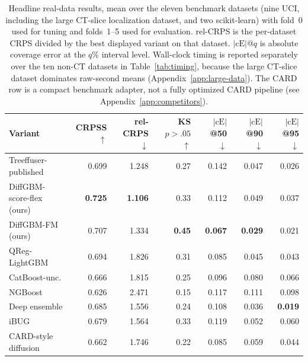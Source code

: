 \documentclass{article}
\begin{document}
\begin{table}[!t]
  \centering
  \caption{Headline real-data results, mean over the eleven benchmark datasets (nine UCI, including the large CT-slice localization dataset, and two scikit-learn) with fold~0 used for tuning and folds~1--5 used for evaluation. rel-CRPS is the per-dataset CRPS divided by the best displayed variant on that dataset. $|\text{cE}|$@$q$ is absolute coverage error at the $q$\% interval level. Wall-clock timing is reported separately over the ten non-CT datasets in Table~\ref{tab:timing}, because the large CT-slice dataset dominates raw-second means (Appendix~\ref{app:large-data}). The CARD row is a compact benchmark adapter, not a fully optimized CARD pipeline (see Appendix~\ref{app:competitors}).}\label{tab:headline}
  \scriptsize
  \begin{tabular}{lrrrrrr}
    \toprule
    Variant & CRPSS $\uparrow$ & rel-CRPS $\downarrow$ & KS $p{>}.05$ $\uparrow$ & $|\text{cE}|$@50 $\downarrow$ & $|\text{cE}|$@90 $\downarrow$ & $|\text{cE}|$@95 $\downarrow$ \\
    \midrule
    Treeffuser-published & 0.699 & 1.248 & 0.27 & 0.142 & 0.047 & 0.026 \\
    DiffGBM-score-flex (ours) & \textbf{0.725} & \textbf{1.106} & 0.33 & 0.112 & 0.049 & 0.037 \\
    DiffGBM-FM (ours) & 0.707 & 1.334 & \textbf{0.45} & \textbf{0.067} & \textbf{0.029} & 0.021 \\
    \midrule
    QReg-LightGBM & 0.694 & 1.826 & 0.31 & 0.085 & 0.045 & 0.043 \\
    CatBoost-unc. & 0.666 & 1.815 & 0.25 & 0.096 & 0.080 & 0.066 \\
    NGBoost & 0.626 & 2.471 & 0.15 & 0.117 & 0.111 & 0.098 \\
    Deep ensemble & 0.685 & 1.556 & 0.24 & 0.108 & 0.036 & \textbf{0.019} \\
    iBUG & 0.679 & 1.564 & 0.33 & 0.119 & 0.052 & 0.060 \\
    CARD-style diffusion & 0.662 & 1.746 & 0.22 & 0.085 & 0.059 & 0.044 \\
    \bottomrule
  \end{tabular}
\end{table}
\end{document}
